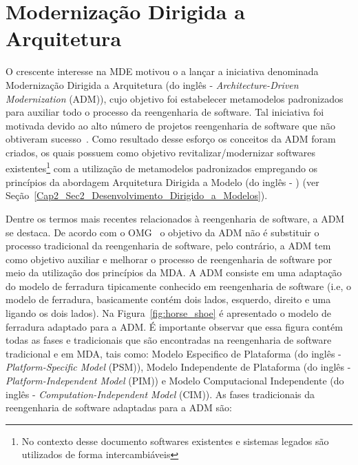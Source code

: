 \section{Modernização Dirigida a Arquitetura}\label{sec:modernizacaoOrientada_Arquitetura}


O crescente interesse na MDE motivou o  a lançar a iniciativa denominada Modernização Dirigida a Arquitetura (do inglês - \textit{Architecture-Driven Modernization} (ADM)), cujo objetivo foi estabelecer metamodelos padronizados para auxiliar todo o  processo da reengenharia de software. Tal iniciativa foi motivada devido ao alto número de projetos reengenharia de software que não obtiveram sucesso~\cite{Sneed_2005, Demeyer2}. Como resultado desse esforço os conceitos da ADM foram criados, os quais possuem como objetivo revitalizar/modernizar softwares existentes\footnote{No contexto desse documento softwares existentes e sistemas legados são utilizados de forma intercambiáveis} com a utilização de metamodelos padronizados empregando os princípios da abordagem Arquitetura Dirigida a Modelo (do inglês - ) (ver Seção~\ref{Cap2_Sec2_Desenvolvimento_Dirigido_a_Modelos}). %

Dentre os termos mais recentes relacionados à reengenharia de software, a ADM se destaca. De acordo com o OMG~\cite{OMG_OMG} o objetivo da ADM não é substituir o processo tradicional da reengenharia de software, pelo contrário, a ADM tem como objetivo auxiliar e melhorar o processo de reengenharia de software por meio da utilização dos princípios da MDA. A ADM consiste em uma adaptação do modelo de ferradura tipicamente conhecido em reengenharia de software (i.e, o modelo de ferradura, basicamente contém dois lados, esquerdo, direito e uma  ligando os dois lados). Na Figura~\ref{fig:horse_shoe} é apresentado o modelo de ferradura adaptado para a ADM. É importante observar que essa figura contém todas as fases e  tradicionais que são encontradas na reengenharia de software tradicional e em MDA, tais como: Modelo Especifico de Plataforma (do inglês - \textit{Platform-Specific Model} (PSM)), Modelo Independente de Plataforma (do inglês - \textit{Platform-Independent Model} (PIM)) e Modelo Computacional Independente (do inglês - \textit{Computation-Independent Model} (CIM)). As fases tradicionais da reengenharia de software adaptadas para a ADM são:


